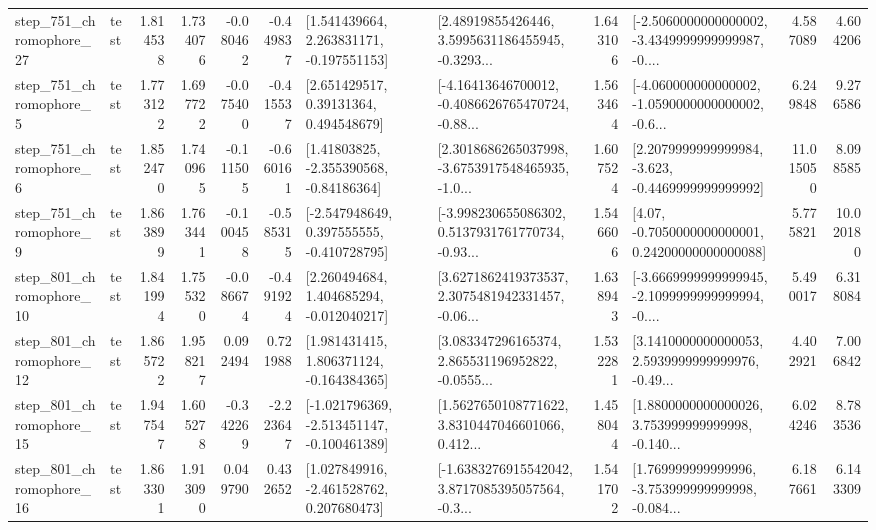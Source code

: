 \begin{tabular}{llrrrrllrlrr}
  step\_751\_chromophore\_27 &      test &      1.814538 &    1.734076 &     -0.080462 & -0.449837 &    [1.541439664, 2.263831171, -0.197551153] &  [2.48919855426446, 3.5995631186455945, -0.3293... &       1.643106 &  [-2.5060000000000002, -3.4349999999999987, -0.... &            4.587089 &          4.604206 \\
   step\_751\_chromophore\_5 &      test &      1.773122 &    1.697722 &     -0.075400 & -0.415537 &      [2.651429517, 0.39131364, 0.494548679] &  [-4.16413646700012, -0.4086626765470724, -0.88... &       1.563464 &  [-4.060000000000002, -1.0590000000000002, -0.6... &            6.249848 &          9.276586 \\
   step\_751\_chromophore\_6 &      test &      1.852470 &    1.740965 &     -0.111505 & -0.660161 &     [1.41803825, -2.355390568, -0.84186364] &  [2.3018686265037998, -3.6753917548465935, -1.0... &       1.607524 &  [2.2079999999999984, -3.623, -0.4469999999999992] &           11.015050 &          8.098585 \\
   step\_751\_chromophore\_9 &      test &      1.863899 &    1.763441 &     -0.100458 & -0.585315 &   [-2.547948649, 0.397555555, -0.410728795] &  [-3.998230655086302, 0.5137931761770734, -0.93... &       1.546606 &   [4.07, -0.7050000000000001, 0.24200000000000088] &            5.775821 &         10.020180 \\
  step\_801\_chromophore\_10 &      test &      1.841994 &    1.755320 &     -0.086674 & -0.491924 &    [2.260494684, 1.404685294, -0.012040217] &  [3.6271862419373537, 2.3075481942331457, -0.06... &       1.638943 &  [-3.6669999999999945, -2.1099999999999994, -0.... &            5.490017 &          6.318084 \\
  step\_801\_chromophore\_12 &      test &      1.865722 &    1.958217 &      0.092494 &  0.721988 &    [1.981431415, 1.806371124, -0.164384365] &  [3.083347296165374, 2.865531196952822, -0.0555... &       1.532281 &  [3.1410000000000053, 2.5939999999999976, -0.49... &            4.402921 &          7.006842 \\
  step\_801\_chromophore\_15 &      test &      1.947547 &    1.605278 &     -0.342269 & -2.223647 &  [-1.021796369, -2.513451147, -0.100461389] &  [1.5627650108771622, 3.8310447046601066, 0.412... &       1.458044 &  [1.8800000000000026, 3.753999999999998, -0.140... &            6.024246 &          8.783536 \\
  step\_801\_chromophore\_16 &      test &      1.863301 &    1.913090 &      0.049790 &  0.432652 &    [1.027849916, -2.461528762, 0.207680473] &  [-1.6383276915542042, 3.8717085395057564, -0.3... &       1.541702 &  [1.769999999999996, -3.753999999999998, -0.084... &            6.187661 &          6.143309 \\

\end{tabular}
